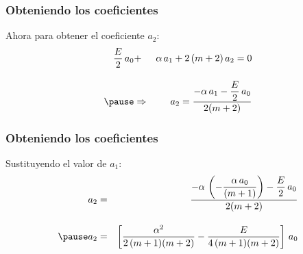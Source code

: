 \documentclass[12pt]{beamer}
\begin{document}
\begin{frame}
\frametitle{Obteniendo los coeficientes}
Ahora para obtener el coeficiente $a_{2}$:
\begin{eqnarray*}
\dfrac{E}{2} \, a_{0} &+& \alpha \, a_{1} + 2 \, (m + 2) \, a_{2} = 0 \\[1em] \pause
&\Rightarrow& \hspace{0.3cm} a_{2} =  \dfrac{- \alpha \, a_{1} - \dfrac{E}{2} \, a_{0}}{2(m + 2)}
\end{eqnarray*}
\end{frame}
\begin{frame}
\frametitle{Obteniendo los coeficientes}
Sustituyendo el valor de $a_{1}$:
\begin{eqnarray*}
a_{2} &=&  \dfrac{- \alpha \, \left( - \dfrac{\alpha \, a_{0}}{(m + 1)} \right) - \dfrac{E}{2} \, a_{0}}{2(m + 2)} \\[1em] \pause
a_{2} &=&  \left[ \dfrac{\alpha^{2}}{2 \, (m + 1)(m + 2)} - \dfrac{E}{4 \, (m + 1)(m + 2)} \right] \, a_{0}
\end{eqnarray*}
\end{frame}
\end{document}

